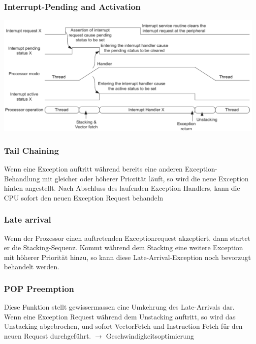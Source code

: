 \subsubsection{Interrupt-Pending and Activation}
\begin{center}
	\includegraphics[width=15cm]{images/interrupt-pending}
\end{center}

\subsubsection{Tail Chaining}
Wenn eine Exception auftritt während bereits eine anderen Exception-Behandlung mit gleicher oder höherer Priorität läuft, so wird die neue Exception hinten angestellt. Nach Abschluss des laufenden Exception Handlers, kann die CPU sofort den neuen Exception Request behandeln

\subsubsection{Late arrival}
Wenn der Prozessor einen auftretenden Exceptionrequest akzeptiert, dann startet er die Stacking-Sequenz. Kommt während dem Stacking eine weitere Exception mit höherer Priorität hinzu, so kann diese Late-Arrival-Exception noch bevorzugt behandelt werden.

\subsubsection{POP Preemption} 
Diese Funktion stellt gewissermassen eine Umkehrung des Late-Arrivals dar. Wenn eine Exception Request während dem Unstacking auftritt, so wird das Unstacking abgebrochen, und sofort VectorFetch und Instruction Fetch für den neuen Request durchgeführt. $\rightarrow$ Geschwindigkeitsoptimierung\\

